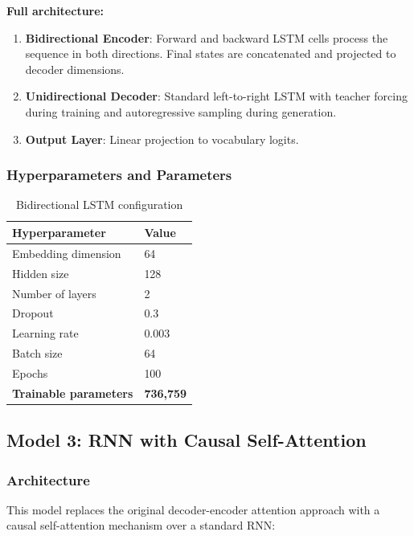 \documentclass[11pt,a4paper]{article}
\begin{document}
\textbf{Full architecture:}
\begin{enumerate}[noitemsep]
    \item \textbf{Bidirectional Encoder}: Forward and backward LSTM cells process the sequence in both directions. Final states are concatenated and projected to decoder dimensions.
    \item \textbf{Unidirectional Decoder}: Standard left-to-right LSTM with teacher forcing during training and autoregressive sampling during generation.
    \item \textbf{Output Layer}: Linear projection to vocabulary logits.
\end{enumerate}

\subsubsection{Hyperparameters and Parameters}
\begin{table}[H]
\centering
\caption{Bidirectional LSTM configuration}
\renewcommand{\arraystretch}{1.3}
\begin{tabularx}{\textwidth}{lX}
\toprule
\textbf{Hyperparameter} & \textbf{Value} \\
\midrule
Embedding dimension & 64 \\
Hidden size & 128 \\
Number of layers & 2 \\
Dropout & 0.3 \\
Learning rate & 0.003 \\
Batch size & 64 \\
Epochs & 100 \\
\midrule
\textbf{Trainable parameters} & \textbf{736,759} \\
\bottomrule
\end{tabularx}
\end{table}

\subsection{Model 3: RNN with Causal Self-Attention}

\subsubsection{Architecture}

This model replaces the original decoder-encoder attention approach with a causal self-attention mechanism over a standard RNN:
\end{document}
